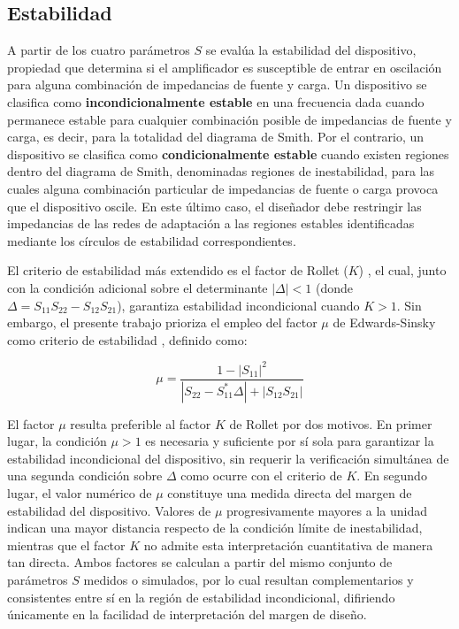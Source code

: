 \subsection{Estabilidad}
A partir de los cuatro parámetros $S$ se evalúa la estabilidad del dispositivo, propiedad que determina si el amplificador es susceptible de entrar en oscilación para alguna combinación de impedancias de fuente y carga. Un dispositivo se clasifica como \textbf{incondicionalmente estable} en una frecuencia dada cuando permanece estable para cualquier combinación posible de impedancias de fuente y carga, es decir, para la totalidad del diagrama de Smith. Por el contrario, un dispositivo se clasifica como \textbf{condicionalmente estable} cuando existen regiones dentro del diagrama de Smith, denominadas regiones de inestabilidad, para las cuales alguna combinación particular de impedancias de fuente o carga provoca que el dispositivo oscile. En este último caso, el diseñador debe restringir las impedancias de las redes de adaptación a las regiones estables identificadas mediante los círculos de estabilidad correspondientes.

El criterio de estabilidad más extendido es el factor de Rollet ($K$) \cite{rollet1962}, el cual, junto con la condición adicional sobre el determinante $|\Delta| < 1$ (donde $\Delta = S_{11}S_{22} - S_{12}S_{21}$), garantiza estabilidad incondicional cuando $K > 1$. Sin embargo, el presente trabajo prioriza el empleo del factor $\mu$ de Edwards-Sinsky como criterio de estabilidad \cite{Edwards1992}, definido como:

\begin{equation}
    \mu = \frac{1 - |S_{11}|^2}{|S_{22} - S_{11}^{*}\Delta| + |S_{12}S_{21}|}
    \label{eq:mu_factor}
\end{equation}

El factor $\mu$ resulta preferible al factor $K$ de Rollet por dos motivos. En primer lugar, la condición $\mu > 1$ es necesaria y suficiente por sí sola para garantizar la estabilidad incondicional del dispositivo, sin requerir la verificación simultánea de una segunda condición sobre $\Delta$ como ocurre con el criterio de $K$. En segundo lugar, el valor numérico de $\mu$ constituye una medida directa del margen de estabilidad del dispositivo. Valores de $\mu$ progresivamente mayores a la unidad indican una mayor distancia respecto de la condición límite de inestabilidad, mientras que el factor $K$ no admite esta interpretación cuantitativa de manera tan directa. Ambos factores se calculan a partir del mismo conjunto de parámetros $S$ medidos o simulados, por lo cual resultan complementarios y consistentes entre sí en la región de estabilidad incondicional, difiriendo únicamente en la facilidad de interpretación del margen de diseño.

